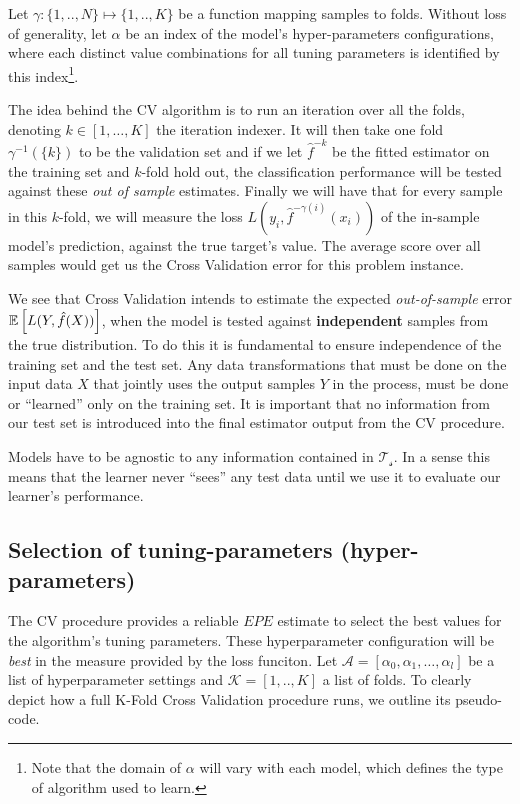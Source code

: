 Let $\gamma : \{1,..,N\} \mapsto \{1, .., K\}$ be a function mapping samples to folds.
Without loss of generality, let $\alpha$ be an index of the model's hyper-parameters configurations, where each distinct value combinations for all tuning parameters is identified by this index\footnote{ Note that the domain of $\alpha$ will vary with each model, which defines the type of algorithm used to learn.}.

The idea behind the CV algorithm is to run an iteration over all the folds, denoting $k \in [1,\ldots,K]$ the iteration indexer.
It will then take one fold $\gamma^{-1}(\{k\})$ to be the validation set and if we let $\hat{f}^{-k}$ be the fitted estimator on the training set and $k$-fold hold out, the classification performance will be tested against these \textit{out of sample} estimates.
Finally we will have that for every sample in this $k$-fold, we will measure the loss $L(y_i, \hat{f}^{-\gamma(i)}(x_i))$ of the in-sample model's prediction, against the true target's value.
The average score over all samples would get us the Cross Validation error for this problem instance.

We see that Cross Validation intends to estimate the expected \textit{out-of-sample} error $\operatorname{\mathbb{E}} \left[ L(Y, \hat{f}(X)) \right]$, when the model is tested against \textbf{independent} samples from the true distribution.
To do this it is fundamental to ensure independence of the training set and the test set.
Any data transformations that must be done on the input data $X$ that jointly uses the output samples $Y$ in the process, must be done or ``learned'' only on the training set.
It is important that no information from our test set is introduced into the final estimator output from the CV procedure.

Models have to be agnostic to any information contained in $\mathcal{T_s}$.
In a sense this means that the learner never ``sees'' any test data until we use it to evaluate our learner's performance.


\subsection{Selection of tuning-parameters (hyper-parameters) }\label{subsection:selection_hyper_params}

The CV procedure provides a reliable $EPE$ estimate to select the best values for the algorithm's tuning parameters.
These hyperparameter configuration will be \textit{best} in the measure provided by the loss funciton.
Let $\mathcal{A} = [\alpha_0, \alpha_1,\ldots, \alpha_l  ]$ be a list of hyperparameter settings and $\mathcal{K} =[1,..,K]$ a list of folds.
To clearly depict how a full K-Fold Cross Validation procedure runs, we outline its pseudo-code.

